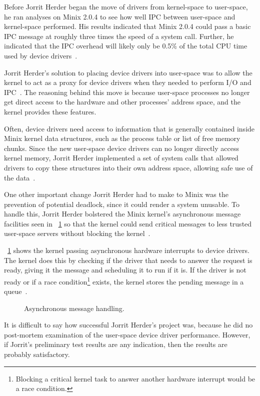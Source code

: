 Before Jorrit Herder began the move of drivers from kernel-space to
user-space, he ran analyses on Minix 2.0.4 to see how well IPC
between user-space and kernel-space performed.  His results indicated that
Minix 2.0.4 could pass a basic IPC message at roughly three times the
speed of a system call.  Further, he indicated that the IPC overhead will
likely only be 0.5\% of the total CPU time used by device
drivers~\cite{herder2005}.

Jorrit Herder's solution to placing device drivers into user-space was to
allow the kernel to act as a proxy for device drivers when they needed to
perform I/O and IPC~\cite{herder2005}.  The reasoning behind this move is
because user-space processes no longer get direct access to the hardware
and other processes' address space, and the kernel provides these features.

Often, device drivers need access to information that is generally contained
inside Minix kernel data structures, such as the process table or list of
free memory chunks.  Since the new user-space device drivers can no longer
directly access kernel memory, Jorrit Herder implemented a set of system
calls that allowed drivers to copy these structures into their own address
space, allowing safe use of the data~\cite{herder2005}.

One other important change Jorrit Herder had to make to Minix was the
prevention of potential deadlock, since it could render a system unusable.
To handle this, Jorrit Herder bolstered the Minix kernel's asynchronous message
facilities seen in \figurename~\ref{fig:minix_async_msg} so that the kernel
could send critical messages to less trusted
user-space servers without blocking the kernel~\cite{herder2005}.

\figurename~\ref{fig:minix_async_msg} shows the kernel passing asynchronous
hardware interrupts to device drivers.  The kernel does this by checking
if the driver that needs to answer the request is ready, giving it the
message and scheduling it to run if it is.  If the driver is not ready or
if a race condition\footnote{Blocking a critical kernel task to answer another
hardware interrupt would be a {\important race condition}.} exists, the kernel
stores the pending message in a queue~\cite{herder2005}.

	\begin{figure}[tbp]
	\begin{center}
	\end{center}
	\caption{Asynchronous message handling.}
	\label{fig:minix_async_msg}
	\end{figure}

It is difficult to say how successful Jorrit Herder's project was, because
he did no post-mortem examination of the user-space device driver performance.
However, if Jorrit's preliminary test results are any indication, then the
results are probably satisfactory.
